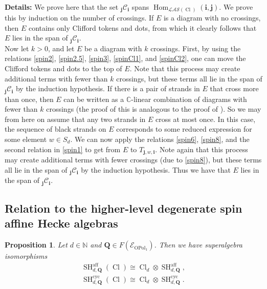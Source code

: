 \documentclass[11pt]{amsart}
\newcommand{\details}[1]{
      \ \\
      {\color{OliveGreen}
        \textbf{Details:} #1
      }
      \\
  }
\newcommand{\details}[1]{}
\newtheorem{prop}[theo]{Proposition}
\theoremstyle{definition}
\numberwithin{equation}{section}
\begin{document}
\details{We prove here that the set $ _{\mathbf{j}} \mathcal{C}_{\mathbf{i}} $ spans  $ \operatorname{Hom}_{\mathcal{LAS}(\operatorname{Cl})}(\mathbf{i}, \mathbf{j}) $. We prove this by induction on the number of crossings. If \(E\) is a diagram with no crossings, then \(E\) contains only Clifford tokens and dots, from which it clearly follows that \(E\) lies in the span of $ _{\mathbf{j}} \mathcal{C}_{\mathbf{i}} $.
\\ \indent Now let $ k > 0 $, and let \(E\) be a diagram with \(k\) crossings. First, by using the relations \cref{spin2}, \cref{spin2.5}, \cref{spin3}, \cref{spinCl1}, and \cref{spinCl2}, one can move the Clifford tokens and dots to the top of \(E\). Note that this process may create additional terms with fewer than \(k\) crossings, but these terms all lie in the span of $ _{\mathbf{j}} \mathcal{C}_{\mathbf{i}} $ by the induction hypothesis. If there is a pair of strands in \(E\) that cross more than once, then \(E\) can be written as a $ \mathbb{C} $-linear combination of diagrams with fewer than $ k $ crossings (the proof of this is analogous to the proof of \cite[Lem.~4.10(3)]{Webster}). So we may from here on assume that any two strands in \(E\) cross at most once. In this case, the sequence of black strands on \(E\) corresponds to some reduced expression for some element $ w \in S_{d} $. We can now apply the relations \cref{spin6}, \cref{spin8}, and the second relation in \cref{spin1} to get from \(E\) to $ T_{\mathbf{j},w,\mathbf{i}} $. Note again that this process may create additional terms with fewer crossings (due to \cref{spin8}), but these terms all lie in the span of $ _{\mathbf{j}} \mathcal{C}_{\mathbf{i}} $ by the induction hypothesis. Thus we have that \(E\) lies in the span of $ _{\mathbf{j}} \mathcal{C}_{\mathbf{i}} $.}





\subsection{Relation to the higher-level degenerate spin affine Hecke algebras}



\begin{prop} \label{greenleaves}
Let $ d \in \mathbb{N} $ and $ \mathbf{Q} \in F(\mathcal{E}_{\operatorname{OPol}_{1}}) $. Then we have superalgebra isomorphisms
\begin{align}
\operatorname{SH}^{\operatorname{aff}}_{d,\mathbf{Q}}(\operatorname{Cl}) \cong \operatorname{Cl}_{d} \otimes \operatorname{SH}^{\operatorname{aff}}_{d,\mathbf{Q}}, \label{isomorphism_1}
\\ \operatorname{SH}^{\operatorname{cyc}}_{d,\mathbf{Q}}(\operatorname{Cl}) \cong \operatorname{Cl}_{d} \otimes \operatorname{SH}^{\operatorname{cyc}}_{d,\mathbf{Q}}. \label{isomorphism_2}
\end{align}
\end{prop}
\end{document}
